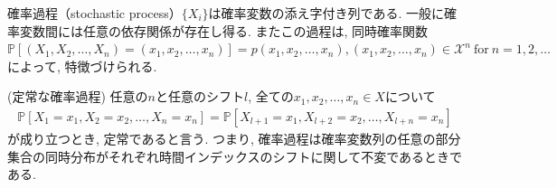 \documentclass[a4j]{jsarticle}
\begin{document}
確率過程（stochastic process）$\{X_i\}$は確率変数の添え字付き列である. 一般に確率変数間には任意の依存関係が存在し得る. またこの過程は, 同時確率関数$\mathbb{P}[(X_1, X_2, \ldots, X_n) = (x_1, x_2, \ldots, x_n)] = p(x_1, x_2, \ldots, x_n), (x_1, x_2, \ldots, x_n) \in \mathcal{X}^n \: \mbox{for} \: n = 1, 2, \ldots$によって, 特徴づけられる.
\\

\begin{itembox}[l]{ (定常な確率過程)}
	任意の$n$と任意のシフト$l$, 全ての$x_1, x_2, \ldots, x_n \in X$について
	\begin{align}
		\mathbb{P}[X_1 = x_1, X_2 =x_2, \ldots, X_n = x_n] = \mathbb{P}[X_{l + 1} = x_1, X_{l + 2} =x_2, \ldots, X_{l + n} = x_n]
	\end{align}
	が成り立つとき, 定常であると言う.
	つまり, 確率過程は確率変数列の任意の部分集合の同時分布がそれぞれ時間インデックスのシフトに関して不変であるときである.
\end{itembox}\\
\end{document}
